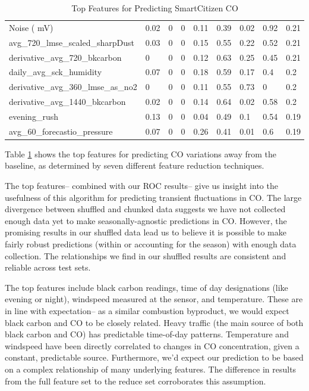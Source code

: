 \begin{table}[]
\begin{tabular}{lllllllll}
Noise ( mV)                         & 0.02  & 0          & 0    & 0.11 & 0.39  & 0.02      & 0.92 & 0.21 \\
avg\_720\_lmse\_scaled\_sharpDust   & 0.03  & 0          & 0    & 0.15 & 0.55  & 0.22      & 0.52 & 0.21 \\
derivative\_avg\_720\_bkcarbon      & 0     & 0          & 0    & 0.12 & 0.63  & 0.25      & 0.45 & 0.21 \\
daily\_avg\_sck\_humidity           & 0.07  & 0          & 0    & 0.18 & 0.59  & 0.17      & 0.4  & 0.2  \\
derivative\_avg\_360\_lmse\_as\_no2 & 0     & 0          & 0    & 0.11 & 0.55  & 0.73      & 0    & 0.2  \\
derivative\_avg\_1440\_bkcarbon     & 0.02  & 0          & 0    & 0.14 & 0.64  & 0.02      & 0.58 & 0.2  \\
evening\_rush                       & 0.13  & 0          & 0    & 0.04 & 0.49  & 0.1       & 0.54 & 0.19 \\
avg\_60\_forecastio\_pressure       & 0.07  & 0          & 0    & 0.26 & 0.41  & 0.01      & 0.6  & 0.19 \\
\bottomrule
\end{tabular}
\label{tab:sck_co_top_features}
\caption{Top Features for Predicting SmartCitizen CO}
\end{table}

Table \ref{tab:sck_co_top_features} shows the top features for predicting CO variations away from the baseline, as determined by seven different feature reduction techniques.   

The top features-- combined with our ROC results-- give us insight into the usefulness of this algorithm for predicting transient fluctuations in CO.  The large divergence between shuffled and chunked data suggests we have not collected enough data yet to make seasonally-agnostic predictions in CO.  However, the promising results in our shuffled data lead us to believe it is possible to make fairly robust predictions (within or accounting for the season) with enough data collection.  The relationships we find in our shuffled results are consistent and reliable across test sets.  

The top features include black carbon readings, time of day designations (like evening or night), windspeed measured at the sensor, and temperature.  These are in line with expectation-- as a similar combustion byproduct, we would expect black carbon and CO to be closely related.  Heavy traffic (the main source of both black carbon and CO) has predictable time-of-day patterns.  Temperature and windspeed have been directly correlated to changes in CO concentration, given a constant, predictable source.   Furthermore, we'd expect our prediction to be based on a complex relationship of many underlying features.  The difference in results from the full feature set to the reduce set corroborates this assumption.   

